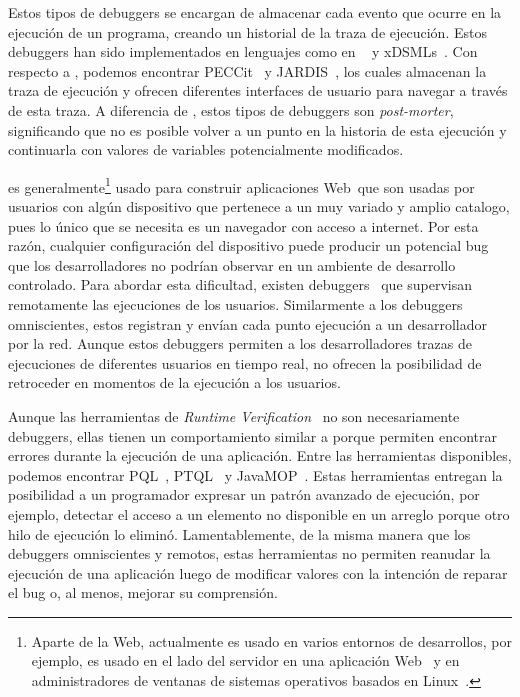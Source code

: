 \documentclass[conference]{IEEEtran}
\begin{document}
\smallskip

 Estos tipos de debuggers se encargan de almacenar cada evento que ocurre en la ejecuci\'on de un programa, creando un historial de la traza de ejecuci\'on. Estos debuggers han sido implementados en lenguajes como en \java~\cite{tod:oopsla2007} y xDSMLs~\cite{bousseAl:SLE2015}. Con respecto a  \javascript, podemos encontrar PECCit~\cite{azar:2016} y JARDIS~\cite{barrAl:fse2016}, los cuales almacenan la traza de ejecuci\'on y ofrecen diferentes interfaces de usuario para navegar a trav\'es de esta traza. A diferencia de \deloreanjs, estos tipos de debuggers son {\em post-morter}, significando que no es posible volver a un punto en la historia de esta ejecuci\'on y continuarla con valores de variables potencialmente modificados. 

\smallskip

 \javascript es generalmente\footnote{Aparte de la Web, \javascript actualmente es usado en varios entornos de desarrollos, por ejemplo, es usado en el lado del servidor en una aplicaci\'on Web~\cite{nodejs:2018} y en administradores de ventanas de sistemas operativos basados en Linux~\cite{gjs}.} usado para construir aplicaciones Web\ que son usadas por usuarios con alg\'un dispositivo que pertenece a un muy variado y amplio catalogo, pues lo \'unico que se necesita es un navegador con acceso a internet. Por esta raz\'on, cualquier configuraci\'on del dispositivo puede producir un potencial bug que los desarrolladores no podr\'ian observar en un ambiente de desarrollo controlado. Para abordar esta dificultad, existen debuggers~\cite{sessionstack,raygun,trackjs} que supervisan remotamente las ejecuciones de los usuarios. Similarmente a los debuggers omniscientes, estos registran y env\'ian cada punto ejecuci\'on a un desarrollador por la red. Aunque estos debuggers permiten a los desarrolladores trazas de ejecuciones de diferentes usuarios en tiempo real, no ofrecen la posibilidad de retroceder en momentos de la ejecuci\'on a los usuarios.   

\smallskip

Aunque las herramientas de {\em Runtime Verification}~\cite{meredith:phd} no son necesariamente debuggers, ellas tienen un comportamiento similar a \deloreanjs porque permiten encontrar errores durante la ejecuci\'on de una aplicaci\'on. Entre las herramientas disponibles, podemos encontrar PQL~\cite{martinAl:oopsla2005}, PTQL~\cite{goldsmithAl:oopsla2005} y JavaMOP~\cite{meredithAl:jsttt2011,chen:oopsla2007}. Estas herramientas entregan la posibilidad a un programador expresar un patr\'on avanzado de ejecuci\'on, por ejemplo, detectar el acceso a un elemento no disponible en un arreglo porque otro hilo de ejecuci\'on lo elimin\'o. Lamentablemente, de la misma manera que los debuggers omniscientes y remotos, estas herramientas no permiten reanudar la ejecuci\'on de una aplicaci\'on luego de modificar valores con la intenci\'on de reparar el bug o, al menos, mejorar su comprensi\'on.    
\end{document}
